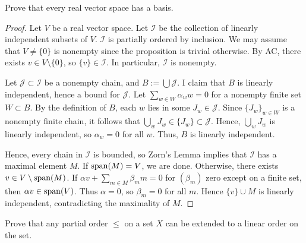 \documentclass{article}
\begin{document}
 Prove that every real vector space has a basis.
\begin{proof}
Let $V$ be a real vector space. Let $\mathcal I$ be the collection of linearly independent subsets of $V$.  $\mathcal I$ is partially ordered by inclusion.  We may assume that $V \neq \{0\}$ is nonempty since the proposition is trivial otherwise.  By AC, there exists $v \in V \setminus \{0\}$, so $\{v\} \in \mathcal I$. In particular, $\mathcal I$ is nonempty.

Let $\mathcal J \subset \mathcal I$ be a nonempty chain, and $B := \bigcup \mathcal J$.  I claim that $B$ is linearly independent, hence a bound for $\mathcal J$. Let $\sum_{w \in W} \alpha_w w = 0$ for a nonempty finite set $W \subset B$.  By the definition of $B$, each $w$ lies in some $J_w \in \mathcal J$.  Since $\{J_w\}_{w\in W}$ is a nonempty finite chain, it follows that $\bigcup_w J_w \in \{J_w\} \subset \mathcal J$. Hence, $\bigcup_w J_w$ is linearly independent, so $\alpha_w = 0$ for all $w$.  Thus, $B$ is linearly independent.

Hence, every chain in $\mathcal I$ is bounded, so Zorn's Lemma implies that $\mathcal I$ has a maximal element $M$.  If $\operatorname{span}(M) = V$, we are done. Otherwise, there exists $v \in V \setminus \operatorname{span}(M)$.  If $\alpha v + \sum_{m \in M} \beta_m m = 0$ for $(\beta_m)$ zero except on a finite set, then $\alpha v \in \operatorname{span}(V)$. Thus $\alpha = 0$, so  $\beta_m = 0$ for all $m$. Hence $\{v\} \cup M$ is linearly independent, contradicting the maximality of $M$.
\end{proof}

 Prove that any partial order $\le$ on a set $X$ can be extended to a linear order on the set.
\end{document}
